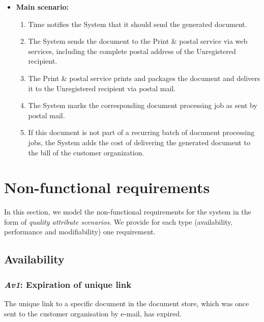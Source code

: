 \documentclass[a4paper,10pt]{article}
\begin{document}
\begin{itemize}
    \item \textbf{Main scenario:} 
    \begin{enumerate}
       \item Time notifies the System that it should send the generated document.
       \item The System sends the document to the Print \& postal service via web services, including the complete postal address of the Unregistered recipient.
       \item The Print \& postal service prints and packages the document and delivers it to the Unregistered recipient via postal mail. 
       \item The System marks the corresponding document processing job as sent by postal mail.
       \item If this document is not part of a recurring batch of document processing jobs, the System adds the cost of delivering the generated document to the bill of the customer organization.
    \end{enumerate}
\end{itemize}



\section{Non-functional requirements}\label{sec:non-functional}
In this section, we model the non-functional requirements for the system in the
form of \emph{quality attribute scenarios}. We provide for each type
(availability, performance and modifiability) one requirement.

\subsection{Availability}
\subsubsection{\emph{Av1}: Expiration of unique link}
The unique link to a specific document in the document store, which was once sent to the customer organisation by e-mail, has expired.
\end{document}
